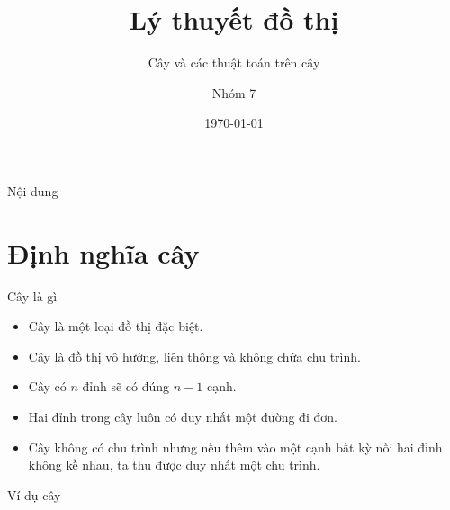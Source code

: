 \documentclass[aspectratio=169]{beamer}
\title{Lý thuyết đồ thị}
\subtitle{Cây và các thuật toán trên cây}
\author{Nhóm 7}
\date{\today}
\begin{document}
\begin{frame}
\titlepage
\end{frame}

\begin{frame}{Nội dung}
\tableofcontents
\end{frame}

\section{Định nghĩa cây}

\begin{frame}{Cây là gì}

\begin{itemize}

    \item Cây là một loại đồ thị đặc biệt.
    \item Cây là đồ thị vô hướng, liên thông và không chứa chu trình.
    \item Cây có $n$ đỉnh sẽ có đúng $n-1$ cạnh.
    \item Hai đỉnh trong cây luôn có duy nhất một đường đi đơn.
    \item Cây không có chu trình nhưng nếu thêm vào một cạnh bất kỳ nối hai đỉnh không kề nhau, ta thu được duy nhất một chu trình.

\end{itemize}

\end{frame}

\begin{frame}{Ví dụ cây}
\begin{center}
\end{center}
\end{frame}
\end{document}
